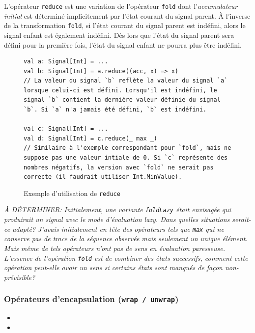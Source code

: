 L'opérateur \texttt{reduce} est une variation de l'opérateur \texttt{fold} dont l'\emph{accumulateur initial} est déterminé implicitement par l'état courant du signal parent. À l'inverse de la transformation \texttt{fold}, si l'état courant du signal parent est indéfini, alors le signal enfant est également indéfini. Dès lors que l'état du signal parent sera défini pour la première fois, l'état du signal enfant ne pourra plus être indéfini.

\begin{figure}[h]
	\begin{lstlisting}
val a: Signal[Int] = ...
val b: Signal[Int] = a.reduce((acc, x) => x)
// La valeur du signal `b` reflète la valeur du signal `a` lorsque celui-ci est défini. Lorsqu'il est indéfini, le signal `b` contient la dernière valeur définie du signal `b`. Si `a` n'a jamais été défini, `b` est indéfini.

val c: Signal[Int] = ...
val d: Signal[Int] = c.reduce(_ max _)
// Similaire à l'exemple correspondant pour `fold`, mais ne suppose pas une valeur intiale de 0. Si `c` représente des nombres négatifs, la version avec `fold` ne serait pas correcte (il faudrait utiliser Int.MinValue).
	\end{lstlisting}
	\caption{Exemple d'utilisation de \texttt{reduce}}
\end{figure}

\textit{À DÉTERMINER: Initialement, une variante \texttt{foldLazy} était envisagée qui produirait un signal avec le mode d'évaluation lazy. Dans quelles situations serait-ce adapté? J'avais initialement en tête des opérateurs tels que \texttt{max} qui ne conserve pas de trace de la séquence observée mais seulement un unique élément. Mais même de tels opérateurs n'ont pas de sens en évaluation paresseuse. L'essence de l'opération \texttt{fold} est de combiner des états successifs, comment cette opération peut-elle avoir un sens si certains états sont manqués de façon non-prévisible?}

\subsubsection{Opérateurs d'encapsulation (\texttt{wrap / unwrap})}

\begin{itemize}
	\item {}
	\item {}
\end{itemize}

